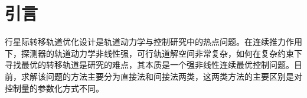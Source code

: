 \section{引\quad 言}行星际转移轨道优化设计是轨道动力学与控制研究中的热点问题。在连续推力作用下，探测器的轨道动力学非线性强，可行轨道解空间非常复杂，如何在复杂约束下寻找最优的转移轨道是研究的难点，其本质是一个强非线性连续最优控制问题。目前，求解该问题的方法主要分为直接法和间接法两类，这两类方法的主要区别是对控制量的参数化方式不同。
